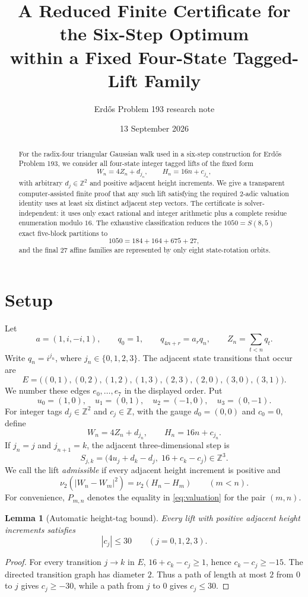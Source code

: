 \documentclass[11pt]{article}
\title{A Reduced Finite Certificate for the Six-Step Optimum\\
within a Fixed Four-State Tagged-Lift Family}
\author{Erd\H{o}s Problem 193 research note}
\date{13 September 2026}
\newtheorem{lemma}{Lemma}
\newcommand{\vTwo}{\nu_2}
\newcommand{\ZZ}{\mathbb{Z}}
\newcommand{\PPair}[2]{P_{#1,#2}}
\begin{document}
\maketitle

\begin{abstract}
For the radix-four triangular Gaussian walk used in a six-step construction for
Erd\H{o}s Problem 193, we consider all four-state integer tagged lifts of the
fixed form
\[
  W_n=4Z_n+d_{j_n},\qquad H_n=16n+c_{j_n},
\]
with arbitrary $d_j\in\ZZ^2$ and positive adjacent height increments. We give
a transparent computer-assisted finite proof that any such lift satisfying the
required $2$-adic valuation identity uses at least six distinct adjacent step
vectors. The certificate is solver-independent: it uses only exact rational
and integer arithmetic plus a complete residue enumeration modulo $16$.
The exhaustive classification reduces the $1050=S(8,5)$ exact five-block
partitions to
\[
  1050=184+164+675+27,
\]
and the final $27$ affine families are represented by only eight state-rotation
orbits.
\end{abstract}

\section{Setup}
Let
\[
 a=(1,i,-i,1),\qquad q_0=1,\qquad q_{4n+r}=a_rq_n,
 \qquad Z_n=\sum_{t<n}q_t.
\]
Write $q_n=i^{j_n}$, where $j_n\in\{0,1,2,3\}$. The adjacent state transitions
that occur are
\[
E=\bigl((0,1),(0,2),(1,2),(1,3),(2,3),(2,0),(3,0),(3,1)\bigr).
\]
We number these edges $e_0,\dots,e_7$ in the displayed order. Put
\[
 u_0=(1,0),\quad u_1=(0,1),\quad u_2=(-1,0),\quad u_3=(0,-1).
\]
For integer tags $d_j\in\ZZ^2$ and $c_j\in\ZZ$, with the gauge $d_0=(0,0)$
and $c_0=0$, define
\[
 W_n=4Z_n+d_{j_n},\qquad H_n=16n+c_{j_n}.
\]
If $j_n=j$ and $j_{n+1}=k$, the adjacent three-dimensional step is
\begin{equation}\label{eq:edge-step}
 S_{j,k}=\bigl(4u_j+d_k-d_j,\;16+c_k-c_j\bigr)\in\ZZ^3.
\end{equation}
We call the lift \emph{admissible} if every adjacent height increment is
positive and
\begin{equation}\label{eq:valuation}
 \vTwo\!\left(|W_n-W_m|^2\right)=\vTwo(H_n-H_m)\qquad(m<n).
\end{equation}
For convenience, $\PPair{m}{n}$ denotes the equality in \eqref{eq:valuation}
for the pair $(m,n)$.

\begin{lemma}[Automatic height-tag bound]\label{lem:c-bound}
Every lift with positive adjacent height increments satisfies
\[
 |c_j|\le30\qquad(j=0,1,2,3).
\]
\end{lemma}
\begin{proof}
For every transition $j\to k$ in $E$, $16+c_k-c_j\ge1$, hence
$c_k-c_j\ge-15$. The directed transition graph has diameter $2$. Thus a path
of length at most $2$ from $0$ to $j$ gives $c_j\ge-30$, while a path from
$j$ to $0$ gives $c_j\le30$.
\end{proof}
\end{document}
